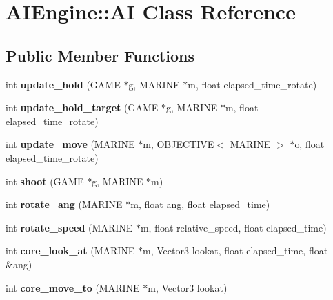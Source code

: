 \hypertarget{classAIEngine_1_1AI}{
\section{AIEngine::AI Class Reference}
\label{classAIEngine_1_1AI}
}
\subsection*{Public Member Functions}
\begin{DoxyCompactItemize}
\item 
\hypertarget{classAIEngine_1_1AI_aa9fa6203309af9bbd133b09b5f29e534}{
int {\bfseries update\_\-hold} (GAME $\ast$g, MARINE $\ast$m, float elapsed\_\-time\_\-rotate)}
\label{classAIEngine_1_1AI_aa9fa6203309af9bbd133b09b5f29e534}

\item 
\hypertarget{classAIEngine_1_1AI_a0d371e3827f196fe734ca2c82810e768}{
int {\bfseries update\_\-hold\_\-target} (GAME $\ast$g, MARINE $\ast$m, float elapsed\_\-time\_\-rotate)}
\label{classAIEngine_1_1AI_a0d371e3827f196fe734ca2c82810e768}

\item 
\hypertarget{classAIEngine_1_1AI_a6701e91de7d06dc5ebbe40e46ddf1ec9}{
int {\bfseries update\_\-move} (MARINE $\ast$m, OBJECTIVE$<$ MARINE $>$ $\ast$o, float elapsed\_\-time\_\-rotate)}
\label{classAIEngine_1_1AI_a6701e91de7d06dc5ebbe40e46ddf1ec9}

\item 
\hypertarget{classAIEngine_1_1AI_a1d8860ccb0360f3481cf7b4d976e669d}{
int {\bfseries shoot} (GAME $\ast$g, MARINE $\ast$m)}
\label{classAIEngine_1_1AI_a1d8860ccb0360f3481cf7b4d976e669d}

\item 
\hypertarget{classAIEngine_1_1AI_ac5ec398c9e7c28c83817d4f072a1c88a}{
int {\bfseries rotate\_\-ang} (MARINE $\ast$m, float ang, float elapsed\_\-time)}
\label{classAIEngine_1_1AI_ac5ec398c9e7c28c83817d4f072a1c88a}

\item 
\hypertarget{classAIEngine_1_1AI_a175d1779f138cc794b4a04b0baf92010}{
int {\bfseries rotate\_\-speed} (MARINE $\ast$m, float relative\_\-speed, float elapsed\_\-time)}
\label{classAIEngine_1_1AI_a175d1779f138cc794b4a04b0baf92010}

\item 
\hypertarget{classAIEngine_1_1AI_a8d5c4f01d202d1f63f8eecd1a07f3cef}{
int {\bfseries core\_\-look\_\-at} (MARINE $\ast$m, Vector3 lookat, float elapsed\_\-time, float \&ang)}
\label{classAIEngine_1_1AI_a8d5c4f01d202d1f63f8eecd1a07f3cef}

\item 
\hypertarget{classAIEngine_1_1AI_a95e75332a71a7fefdc4bf4d026000951}{
int {\bfseries core\_\-move\_\-to} (MARINE $\ast$m, Vector3 lookat)}
\label{classAIEngine_1_1AI_a95e75332a71a7fefdc4bf4d026000951}

\end{DoxyCompactItemize}
